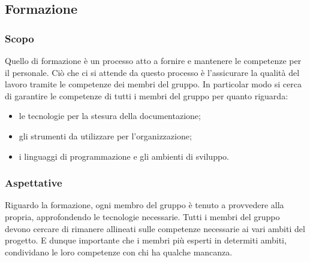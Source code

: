 \subsection{Formazione}
\subsubsection{Scopo}
Quello di formazione è un processo atto a fornire e mantenere le competenze per il personale. Ciò che ci si attende da questo processo è l'assicurare la qualità del lavoro tramite le competenze dei membri del gruppo. 
In particolar modo si cerca di garantire le competenze di tutti i membri del gruppo per quanto riguarda:
\begin{itemize}
	\item le tecnologie per la stesura della documentazione;
	\item gli strumenti da utilizzare per l'organizzazione;
	\item i linguaggi di programmazione e gli ambienti di sviluppo.
\end{itemize}
\subsubsection{Aspettative}
Riguardo la formazione, ogni membro del gruppo è tenuto a provvedere alla propria, approfondendo le tecnologie necessarie. Tutti i membri del gruppo devono cercare di rimanere allineati sulle competenze necessarie ai vari ambiti del progetto. E dunque importante che i membri più esperti in determiti ambiti, condividano le loro competenze con chi ha qualche mancanza.

